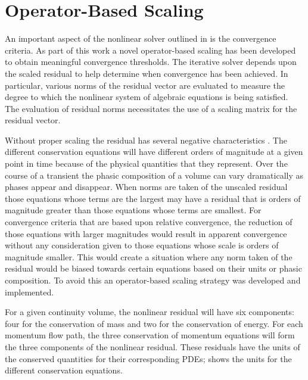\section{Operator-Based Scaling}
\label{sect:nlnScaling}

An important aspect of the nonlinear solver outlined in  is the convergence criteria.
As part of this work a novel operator-based scaling has been developed to obtain meaningful convergence thresholds.
The iterative solver depends upon the scaled residual to help determine when convergence has been achieved.
In particular, various norms of the residual vector are evaluated to measure the degree to which the nonlinear system of algebraic equations is being satisfied.
The evaluation of residual norms necessitates the use of a scaling matrix for the residual vector.

Without proper scaling the residual has several negative characteristics \cite{Frepoli2003, McHugh1995}.
The different conservation equations will have different orders of magnitude at a given point in time because of the physical quantities that they represent.
Over the course of a transient the phasic composition of a volume can vary dramatically as phases appear and disappear.
When norms are taken of the unscaled residual those equations whose terms are the largest may have a residual that is orders of magnitude greater than those equations whose terms are smallest.
For convergence criteria that are based upon relative convergence, the reduction of those equations with larger magnitudes would result in apparent convergence without any consideration given to those equations whose scale is orders of magnitude smaller.
This would create a situation where any norm taken of the residual would be biased towards certain equations based on their units or phasic composition.
To avoid this an operator-based scaling strategy was developed and implemented.

For a given continuity volume, the nonlinear residual will have six components: four for the conservation of mass and two for the conservation of energy.
For each momentum flow path, the three conservation of momentum equations will form the three components of the nonlinear residual.
These residuals have the units of the conserved quantities for their corresponding PDEs;  shows the units for the different conservation equations.

